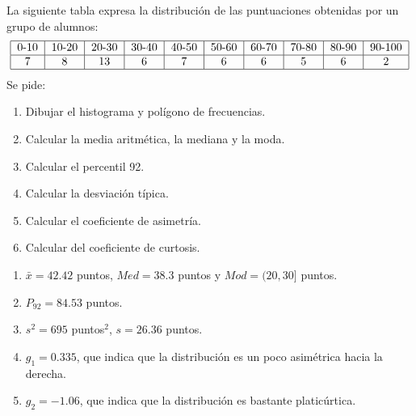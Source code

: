 {La siguiente tabla expresa la distribución de las puntuaciones obtenidas por un grupo de alumnos:
\[
\begin{tabular}{|c|c|c|c|c|c|c|c|c|c|}
\hline
0-10 & 10-20 & 20-30 & 30-40 & 40-50 & 50-60 & 60-70 & 70-80 & 80-90 & 90-100
\\ \hline
7 & 8 & 13 & 6 & 7 & 6 & 6 & 5 & 6 & 2 \\ \hline
\end{tabular}
\]
Se pide:
\begin{enumerate}
\item  Dibujar el histograma y polígono de frecuencias.
\item  Calcular la media aritmética, la mediana y la moda.
\item  Calcular el percentil 92.
\item  Calcular la desviación típica.
\item  Calcular el coeficiente de asimetría.
\item  Calcular del coeficiente de curtosis.
\end{enumerate}
}
{
\begin{enumerate}[start=2]
\item $ \bar{x} = 42.42$ puntos, $Med =38.3$ puntos y $Mod= (20,30]$ puntos.
\item $P_{92}=84.53$ puntos.
\item $s^2 = 695$ puntos$^2$, $s= 26.36$ puntos.
\item $g_1 = 0.335$, que indica que la distribución es un poco asimétrica hacia la derecha.
\item $g_2 = -1.06$, que indica que la distribución es bastante platicúrtica.
\end{enumerate}
}
{}



